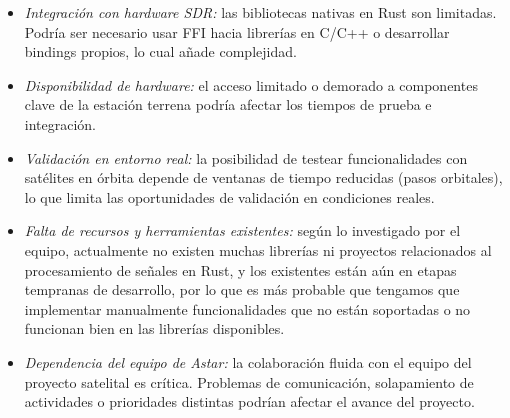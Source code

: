 \begin{itemize}
    \item \textit{Integración con hardware SDR:} las bibliotecas nativas en Rust son limitadas. Podría ser necesario usar FFI hacia librerías en C/C++ o desarrollar bindings propios, lo cual añade complejidad.
    
    \item \textit{Disponibilidad de hardware:} el acceso limitado o demorado a componentes clave de la estación terrena podría afectar los tiempos de prueba e integración.

    \item \textit{Validación en entorno real:} la posibilidad de testear funcionalidades con satélites en órbita depende de ventanas de tiempo reducidas (pasos orbitales), lo que limita las oportunidades de validación en condiciones reales.

    \item \textit{Falta de recursos y herramientas existentes:} según lo investigado por el equipo, actualmente no existen muchas librerías ni proyectos relacionados al procesamiento de señales en Rust, y los existentes están aún en etapas tempranas de desarrollo, por lo que es más probable que tengamos que implementar manualmente funcionalidades que no están soportadas o no funcionan bien en las librerías disponibles.
    
    \item \textit{Dependencia del equipo de Astar:} la colaboración fluida con el equipo del proyecto satelital es crítica. Problemas de comunicación, solapamiento de actividades o prioridades distintas podrían afectar el avance del proyecto.
\end{itemize}